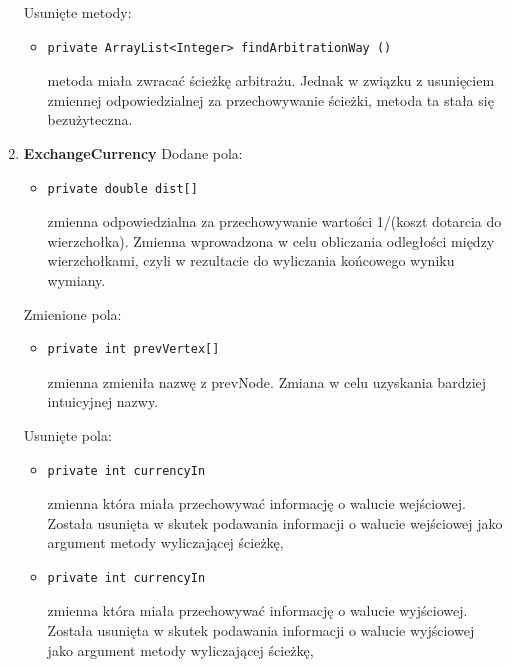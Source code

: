 \documentclass[12pt]{article}
\begin{document}
\begin{enumerate}
\begin{itemize}
    \end{itemize}
    Usunięte metody:
    \begin{itemize}
     \item \begin{verbatim}private ArrayList<Integer> findArbitrationWay ()\end{verbatim}
        metoda miała zwracać ścieżkę arbitrażu. Jednak w związku z usunięciem zmiennej odpowiedzialnej za przechowywanie ścieżki, metoda ta stała się bezużyteczna.
    \end{itemize}
\item \textbf{ExchangeCurrency}
\newline\newline
   Dodane pola:
    \begin{itemize}
        \item \begin{verbatim}private double dist[]\end{verbatim}
        zmienna odpowiedzialna za przechowywanie wartości 1/(koszt dotarcia do wierzchołka). Zmienna wprowadzona w celu obliczania odległości między wierzchołkami, czyli w rezultacie do wyliczania końcowego wyniku wymiany.
    \end{itemize}
    Zmienione pola:
    \begin{itemize}
    \item \begin{verbatim}private int prevVertex[]\end{verbatim}
        zmienna zmieniła nazwę z prevNode. Zmiana w celu uzyskania bardziej intuicyjnej nazwy.
    \end{itemize}
    Usunięte pola:
     \begin{itemize}
     \item \begin{verbatim}private int currencyIn\end{verbatim}
        zmienna która miała przechowywać informację o walucie wejściowej. Została usunięta w skutek podawania informacji o walucie wejściowej jako argument metody wyliczającej ścieżkę,
    \end{itemize}
    \begin{itemize}
     \item \begin{verbatim}private int currencyIn\end{verbatim}
        zmienna która miała przechowywać informację o walucie wyjściowej. Została usunięta w skutek podawania informacji o walucie wyjściowej jako argument metody wyliczającej ścieżkę,

\end{itemize}
\end{enumerate}
\end{document}
